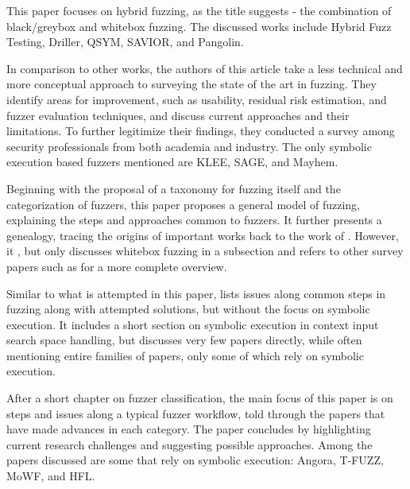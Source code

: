 \documentclass{article}
\begin{document}
\begin{multicols}{2}
    This paper focuses on hybrid fuzzing, as the title suggests - the combination of black/greybox and whitebox fuzzing. The discussed works include Hybrid Fuzz Testing\cite{HybridFuzzTesting}, Driller\cite{Driller}, QSYM\cite{QSYM}, SAVIOR\cite{SAVIOR}, and Pangolin\cite{Pangolin}.

    In comparison to other works, the authors of this article take a less technical and more conceptual approach to surveying the state of the art in fuzzing. They identify areas for improvement, such as usability, residual risk estimation, and fuzzer evaluation techniques, and discuss current approaches and their limitations. To further legitimize their findings, they conducted a survey among security professionals from both academia and industry. The only symbolic execution based fuzzers mentioned are KLEE\cite{KLEE}, SAGE\cite{SAGE}, and Mayhem\cite{Mayhem}.

    Beginning with the proposal of a taxonomy for fuzzing itself and the categorization of fuzzers, this paper proposes a general model of fuzzing, explaining the steps and approaches common to fuzzers. It further presents a genealogy, tracing the origins of important works back to the work of \citeauthor{UNIX}. However, it \cite{ArtScienceEng}, but only discusses whitebox fuzzing in a subsection and refers to other survey papers such as \cite{Orchestrated, AllYouEverWanted} for a more complete overview.

    Similar to what is attempted in this paper,  lists issues along common steps in fuzzing along with attempted solutions, but without the focus on symbolic execution. It includes a short section on symbolic execution in context input search space handling, but discusses very few papers directly, while often mentioning entire families of papers, only some of which rely on symbolic execution.

    After a short chapter on fuzzer classification, the main focus of this paper is on steps and issues along a typical fuzzer workflow, told through the papers that have made advances in each category. The paper concludes by highlighting current research challenges and suggesting possible approaches. Among the papers discussed are some that rely on symbolic execution: Angora\cite{Angora}, T-FUZZ\cite{TFuzz}, MoWF\cite{MoWF}, and HFL\cite{HFL}.


\end{multicols}
\end{document}
